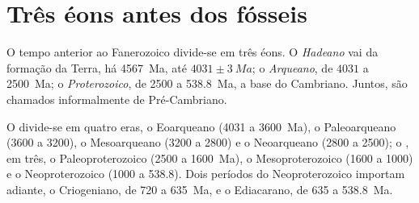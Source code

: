 \section{Três éons antes dos fósseis}\label{sec:b2:precambrian-earth:eons}

\begin{definition}\label{def:b2:precambrian-earth:eons}
O tempo anterior ao Fanerozoico divide-se em três éons. O \emph{Hadeano}
vai da formação da Terra, há \qty{4567}{Ma}, até $4031 \pm \qty{3}{Ma}$; o
\emph{Arqueano}, de $4031$ a \qty{2500}{Ma}; o
\emph{Proterozoico}, de 2500 a \qty{538.8}{Ma}, a base do Cambriano.
Juntos, são chamados informalmente de Pré-Cambriano.
\end{definition}

O  divide-se em quatro eras, o Eoarqueano (4031 a \qty{3600}{Ma}), o Paleoarqueano (3600
a 3200), o Mesoarqueano (3200 a 2800) e o Neoarqueano (2800 a 2500); o , em três,
o Paleoproterozoico (2500 a \qty{1600}{Ma}), o Mesoproterozoico (1600 a 1000) e o
Neoproterozoico (1000 a 538.8). Dois períodos do Neoproterozoico importam adiante, o Criogeniano, de 720 a
\qty{635}{Ma}, e o Ediacarano, de 635 a \qty{538.8}{Ma}.

